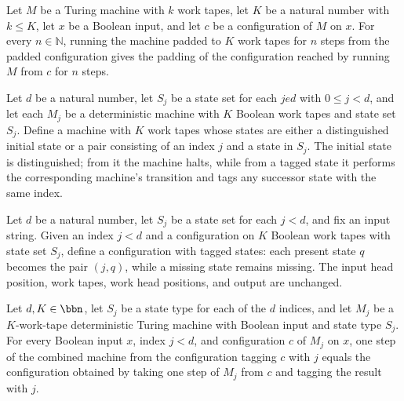 \begin{lemma}
\label{Complexity.LogProg.padTM_runFrom}
\leanok
{}
Let $M$ be a Turing machine with $k$ work tapes, let $K$ be a natural number with $k\le
K$, let $x$ be a Boolean input, and let $c$ be a configuration of $M$ on $x$. For every
$n\in\mathbb{N}$, running the machine padded to $K$ work tapes for $n$ steps from the
padded configuration gives the padding of the configuration reached by running $M$ from
$c$ for $n$ steps.
\end{lemma}

\begin{definition}
\label{Complexity.LogProg.sigmaTM}
\leanok
{}
Let $d$ be a natural number, let $S_j$ be a state set for each $j
e d$ with $0\le j<d$, and let each $M_j$ be a deterministic machine with $K$ Boolean
work tapes and state set $S_j$. Define a machine with $K$ work tapes whose states are
either a distinguished initial state or a pair consisting of an index $j$ and a state in
$S_j$. The initial state is distinguished; from it the machine halts, while from a
tagged state it performs the corresponding machine's transition and tags any successor
state with the same index.
\end{definition}

\begin{definition}
\label{Complexity.LogProg.sigCfg}
\leanok
{}
Let $d$ be a natural number, let $S_j$ be a state set for each $j<d$, and fix an input
string. Given an index $j<d$ and a configuration on $K$ Boolean work tapes with state
set $S_j$, define a configuration with tagged states: each present state $q$ becomes the
pair $(j,q)$, while a missing state remains missing. The input head position, work
tapes, work head positions, and output are unchanged.
\end{definition}

\begin{lemma}
\label{Complexity.LogProg.sigmaTM_step}
\leanok
{}
Let $d,K\in\bbn$, let $S_j$ be a state type for each of the $d$ indices, and let $M_j$
be a $K$-work-tape deterministic Turing machine with Boolean input and state type $S_j$.
For every Boolean input $x$, index $j<d$, and configuration $c$ of $M_j$ on $x$, one
step of the combined machine from the configuration tagging $c$ with $j$ equals the
configuration obtained by taking one step of $M_j$ from $c$ and tagging the result with
$j$.
\end{lemma}

